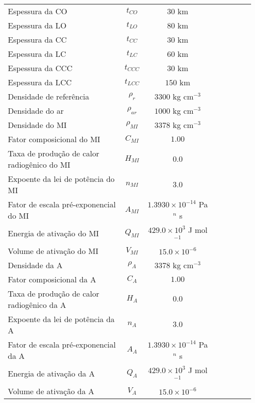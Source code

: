 \begin{center}
\begin{longtable}{lccccccc}
        Espessura da CO & $t_{CO}$ & $30$ km \\
        Espessura da LO & $t_{LO}$ & $80$ km \\
    
        Espessura da CC & $t_{CC}$ & $30$ km \\
        Espessura da LC & $t_{LC}$ & $60$ km \\

        Espessura da CCC & $t_{CCC}$ & $30$ km \\
        Espessura da LCC & $t_{LCC}$ & $150$ km \\
        
        Densidade de referência & $\rho_r$ & $3300$ kg cm$^{-3}$ \\
        Densidade do ar & $\rho_{ar}$ & $1000$ kg cm$^{-3}$ \\

        Densidade do MI & $\rho_{MI}$ & $3378$ kg cm$^{-3}$ \\
        Fator composicional do MI & $C_{MI}$ & $1.00$ \\
        Taxa de produção de calor radiogênico do MI & $H_{MI}$ & $0.0$ \\
        Expoente da lei de potência do MI & $n_{MI}$ & $3.0$ \\
        Fator de escala pré-exponencial do MI & $A_{MI}$ & $1.3930\times10^{-14}$ Pa$^{n}$ s \\
        Energia de ativação do MI & $Q_{MI}$ & $429.0\times10^{3}$ J mol$^{-1}$ \\
        Volume de ativação do MI & $V_{MI}$ & $15.0\times10^{-6}$ \\

        Densidade da A & $\rho_{A}$ & $3378$ kg cm$^{-3}$ \\
        Fator composicional da A & $C_{A}$ & $1.00$ \\
        Taxa de produção de calor radiogênico da A & $H_{A}$ & $0.0$ \\
        Expoente da lei de potência da A & $n_{A}$ & $3.0$ \\
        Fator de escala pré-exponencial da A & $A_{A}$ & $1.3930\times10^{-14}$ Pa$^{n}$ s \\
        Energia de ativação da A & $Q_{A}$ & $429.0\times10^{3}$ J mol$^{-1}$ \\
        Volume de ativação da A & $V_{A}$ & $15.0\times10^{-6}$ \\


\end{longtable}
\end{center}
